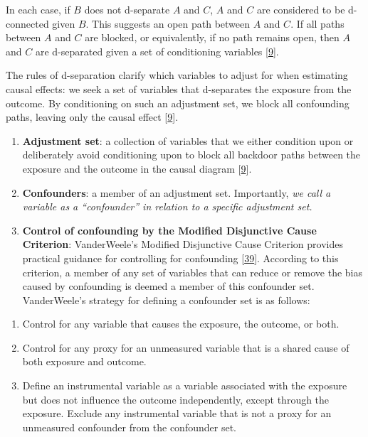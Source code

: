 \documentclass[
  singlecolumn]{article}
\providecommand{\tightlist}{%
  \setlength{\itemsep}{0pt}\setlength{\parskip}{0pt}}\usepackage{longtable,booktabs,array}
\begin{document}
In each case, if \(B\) does not d-separate \(A\) and \(C\), \(A\) and
\(C\) are considered to be d-connected given \(B\). This suggests an
open path between \(A\) and \(C\). If all paths between \(A\) and \(C\)
are blocked, or equivalently, if no path remains open, then \(A\) and
\(C\) are d-separated given a set of conditioning variables
{[}\protect\hyperlink{ref-pearl2009}{9}{]}.

The rules of d-separation clarify which variables to adjust for when
estimating causal effects: we seek a set of variables that d-separates
the exposure from the outcome. By conditioning on such an adjustment
set, we block all confounding paths, leaving only the causal effect
{[}\protect\hyperlink{ref-pearl2009}{9}{]}.

\begin{enumerate}
\def\labelenumi{\arabic{enumi}.}
\setcounter{enumi}{4}
\item
  \textbf{Adjustment set}: a collection of variables that we either
  condition upon or deliberately avoid conditioning upon to block all
  backdoor paths between the exposure and the outcome in the causal
  diagram {[}\protect\hyperlink{ref-pearl2009}{9}{]}.
\item
  \textbf{Confounders}: a member of an adjustment set. Importantly,
  \emph{we call a variable as a ``confounder'' in relation to a specific
  adjustment set.}
\item
  \textbf{Control of confounding by the Modified Disjunctive Cause
  Criterion}: VanderWeele's Modified Disjunctive Cause Criterion
  provides practical guidance for controlling for confounding
  {[}\protect\hyperlink{ref-vanderweele2019}{39}{]}. According to this
  criterion, a member of any set of variables that can reduce or remove
  the bias caused by confounding is deemed a member of this confounder
  set. VanderWeele's strategy for defining a confounder set is as
  follows:
\end{enumerate}

\begin{enumerate}
\def\labelenumi{\alph{enumi}.}
\tightlist
\item
  Control for any variable that causes the exposure, the outcome, or
  both.
\item
  Control for any proxy for an unmeasured variable that is a shared
  cause of both exposure and outcome.
\item
  Define an instrumental variable as a variable associated with the
  exposure but does not influence the outcome independently, except
  through the exposure. Exclude any instrumental variable that is not a
  proxy for an unmeasured confounder from the confounder set.
\end{enumerate}
\end{document}
